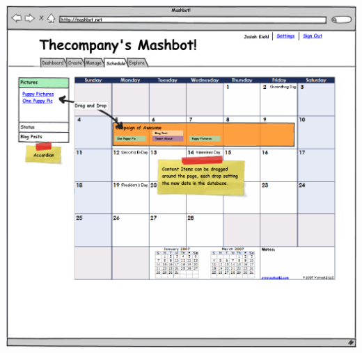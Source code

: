 \documentclass{article}
\begin{document}
\begin{itemize}
  \includegraphics[width=\textwidth]{../mockups/schedule-content.png}
\end{itemize}
\end{document}
